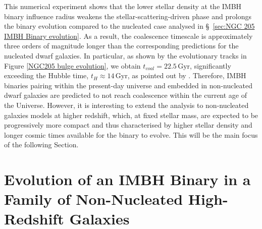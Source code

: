 \documentclass[12pt,twoside,openany]{book}
\begin{document}
This numerical experiment shows that the lower stellar density at the IMBH binary influence radius weakens the stellar-scattering-driven phase and prolongs the binary evolution compared to the nucleated case analysed in \S~\ref{sec:NGC 205 IMBH Binary evolution}. As a result, the coalescence timescale is approximately three orders of magnitude longer than the corresponding predictions for the nucleated dwarf galaxies. In particular, as shown by the evolutionary tracks in Figure \ref{NGC205 bulge evolution}, we obtain $t_{coal}=22.5\, \mathrm{Gyr}$, significantly exceeding the Hubble time, $t_H\approx14\,\mathrm{Gyr}$, as pointed out by \textcite{Khan_2024}. Therefore, IMBH binaries pairing within the present-day universe and embedded in non-nucleated dwarf galaxies are predicted to not reach coalescence within the current age of the Universe. However, it is interesting to extend the analysis to non-nucleated galaxies models at higher redshift, which, at fixed stellar mass, are expected to be progressively more compact and thus characterised by higher stellar density and longer cosmic times available for the binary to evolve. This will be the main focus of the following Section.










\section{Evolution of an IMBH Binary in a Family of Non-Nucleated High-Redshift Galaxies
}
\label{sec:Cosmic Size Evolution Down to NGC 205}
\end{document}
